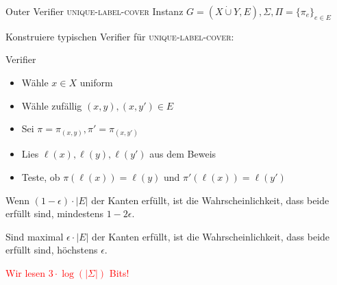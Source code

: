\documentclass[table,german,10pt]{beamer}
\newcommand{\red}[1]{\textcolor{red}{#1}}
\begin{document}
\begin{frame}{Outer Verifier}
\textsc{unique-label-cover} Instanz
      $G=(X\dot{\cup}Y,E),\Sigma,\Pi=\{\pi_{e}\}_{e\in E}$

Konstruiere typischen Verifier für \textsc{unique-label-cover}:

\pause
\begin{block}{Verifier}
\begin{itemize}[<+->]
\item Wähle $x\in X$ uniform
\item Wähle zufällig $(x,y),(x,y')\in E$
\item Sei $\pi=\pi_{(x,y)},\pi'=\pi_{(x,y')}$
\item Lies $\ell(x),\ell(y),\ell(y')$ aus dem Beweis
\item Teste, ob $\pi(\ell(x))=\ell(y)$ und $\pi'(\ell(x))=\ell(y')$

\end{itemize}
\end{block}

\pause
Wenn $(1-\epsilon)\cdot |E|$ der Kanten erfüllt, ist die
Wahrscheinlichkeit, dass beide erfüllt sind, mindestens $1-2\epsilon$. 
\pause

Sind maximal $\epsilon\cdot |E|$ der Kanten erfüllt, ist die
Wahrscheinlichkeit, dass beide erfüllt sind, höchstens $\epsilon$. 

\pause
\red{Wir lesen $3\cdot \log(|\Sigma|)$ Bits!}
  
\end{frame}
\end{document}
